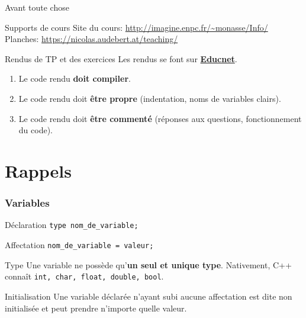 
\subtitle{Les tableaux statiques}
\date[28 sep. 2018]{Vendredi 28 septembre 2018}
\maketitle

\begin{frame}{Avant toute chose}
  \begin{block}{Supports de cours}
    Site du cours: {\small \url{http://imagine.enpc.fr/~monasse/Info/}}\\
  	Planches: {\small \url{https://nicolas.audebert.at/teaching/}}
  \end{block}

  \begin{alertblock}{Rendus de TP et des exercices}
  Les rendus se font sur \href{https://educnet.enpc.fr}{\textbf{Educnet}}.
  \begin{enumerate}
  	\item Le code rendu \textbf{doit compiler}.
    \item Le code rendu doit \textbf{être propre} (indentation, noms de variables clairs).
    \item Le code rendu doit \textbf{être commenté} (réponses aux questions, fonctionnement du code).
  \end{enumerate}
  \end{alertblock}

\end{frame}

\section{Rappels}

\begin{frame}
	\frametitle{Variables}
    \begin{block}{Déclaration}
    \texttt{type nom_de_variable;}
    \end{block}
    
    \begin{block}{Affectation}
    \texttt{nom_de_variable = valeur;}
    \end{block}
    
    \begin{alertblock}{Type}
    Une variable ne possède qu'\textbf{un seul et unique type}. Nativement, C++ connaît \texttt{int, char, float, double, bool}.
    \end{alertblock}
    
    \begin{alertblock}{Initialisation}
    Une variable déclarée n'ayant subi aucune affectation est dite non initialisée et peut prendre n'importe quelle valeur.
    \end{alertblock}
\end{frame}

